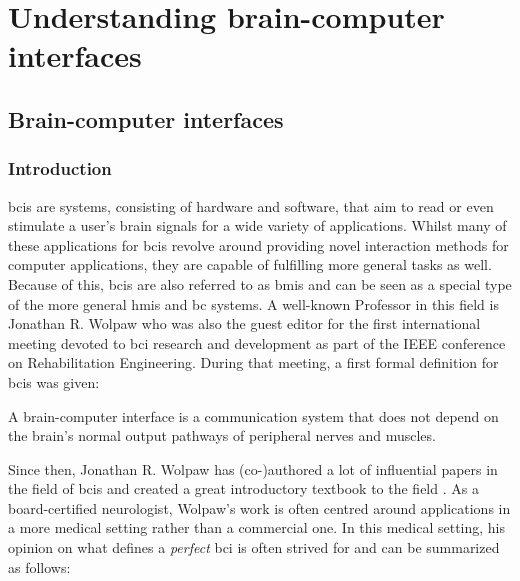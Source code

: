 \part{Understanding brain-computer interfaces}
\label{part:understanding}


\glsresetall

\chapter{Brain-computer interfaces}
\label{ch:bci}

\section{Introduction}
\label{sec:bci_introduction}

\Glspl{bci} are systems, consisting of hardware and software, that aim to read or even stimulate a user's brain signals for a wide variety of applications.
Whilst many of these applications for \glspl{bci} revolve around providing novel interaction methods for computer applications, they are capable of fulfilling more general tasks as well.
Because of this, \glspl{bci} are also referred to as \glspl{bmi} and can be seen as a special type of the more general \glspl{hmi} and \gls{bc} systems.
A well-known Professor in this field is Jonathan R. Wolpaw who was also the guest editor for the first international meeting devoted to \gls{bci} research and development as part of the IEEE conference on Rehabilitation Engineering.
During that meeting, a first formal definition for \glspl{bci} was given:

\setlength{\epigraphwidth}{0.9\textwidth}
\epigraph{A brain-computer interface is a communication system that does not depend on the brain’s normal output pathways of peripheral nerves and muscles.}{\textit{\citet{first_bci_meeting}}}

Since then, Jonathan R. Wolpaw has (co-)authored a lot of influential papers in the field of \glspl{bci} \citep{bci_rehabilitation, bci_in_medicine, first_bci_meeting} and created a great introductory textbook to the field \citep{bci_book}.
As a board-certified neurologist, Wolpaw's work is often centred around applications in a more medical setting rather than a commercial one. In this medical setting, his opinion on what defines a \textit{perfect} \gls{bci} is often strived for and can be summarized as follows:

